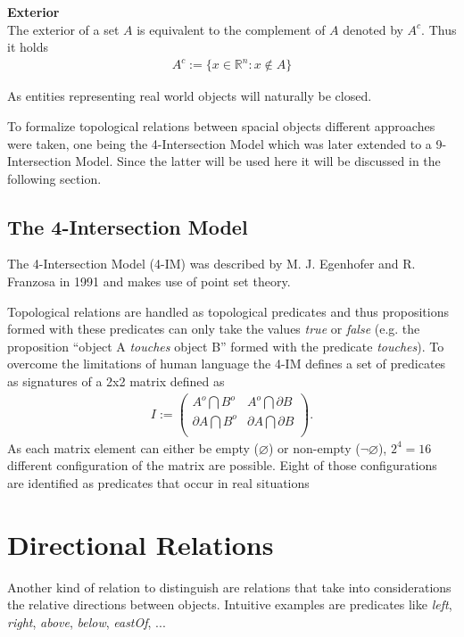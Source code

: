 \documentclass[paper=a4, fontsize=11pt]{scrartcl} %
\numberwithin{equation}{section} %
\numberwithin{figure}{section} %
\numberwithin{table}{section} %
\begin{document}
\textbf{Exterior} \\
The exterior of a set $A$ is equivalent to the complement of $A$ denoted by $A^c$. Thus it holds
\begin{align*}
  A^c:=\{x\in \mathbb{R}^n:x\notin A\}
\end{align*}


As entities representing real world objects will naturally be closed.  

To formalize topological relations between spacial objects different approaches were taken, one being the 4-Intersection Model which was later extended to a 9-Intersection Model. Since the latter will be used here it will be discussed in the following section.

\subsection{The 4-Intersection Model}
The 4-Intersection Model (4-IM) was described by M. J. Egenhofer and R. Franzosa in 1991 \cite{Egenhofer:1991:IJGIS} and makes use of point set theory. 


Topological relations are handled as topological predicates and thus propositions formed with these predicates can only take the values \emph{true} or \emph{false} (e.g. the proposition ``object A \emph{touches} object B'' formed with the predicate \emph{touches}). 
To overcome the limitations of human language the 4-IM defines a set of predicates as signatures of a 2x2 matrix defined as 
\begin{align*}
  I := \begin{pmatrix}
    A^{o} \bigcap B^{o}        & A^{o} \bigcap \partial B  \\
    \partial A \bigcap B^{o}  & \partial A \bigcap \partial B  \\
  \end{pmatrix}.
\end{align*}
As each matrix element can either be empty ($\varnothing$) or non-empty ($\neg\varnothing$), $2^4 = 16$ different configuration of the matrix are possible. Eight of those configurations are identified as predicates that occur in real situations 

\section{Directional Relations}\label{sec:directional-relations}

Another kind of relation to distinguish are relations that take into considerations the relative directions between objects. Intuitive examples are predicates like \emph{left}, \emph{right}, \emph{above}, \emph{below}, \emph{eastOf}, ...
\end{document}
